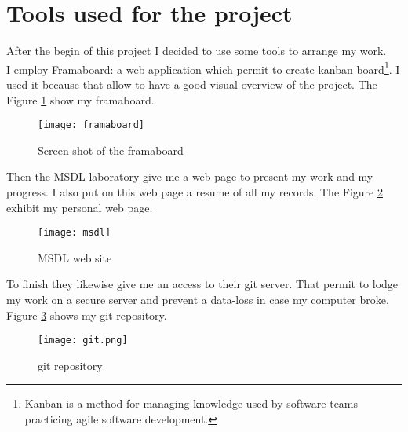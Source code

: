 \section{Tools used for the project}

After the begin of this project I decided to use some tools to arrange my work.
~\\

I employ Framaboard: a web application which permit to create kanban board\footnote{Kanban is a method for managing knowledge used by software teams practicing agile software development.\cite{wiki_kanban}}. I used it because that allow to have a good visual overview of the project. The Figure \ref{fig:framaboard} show my framaboard.

\begin{figure}[h]
  \centering
  \texttt{[image: framaboard]}
  \caption{Screen shot of the framaboard}
  \label{fig:framaboard}
\end{figure}

Then the MSDL laboratory give me a web page to present my work and my progress. I also put on this web page a resume of all my records. The Figure \ref{fig:msdl} exhibit my personal web page.

\begin{figure}[h]
  \centering
  \texttt{[image: msdl]}
  \caption{MSDL web site}
  \label{fig:msdl}
\end{figure}


To finish they likewise give me an access to their git server. That permit to lodge my work on a secure server and prevent a data-loss in case my computer broke. Figure \ref{fig:git} shows my git repository.

\begin{figure}[h]
  \centering
  \texttt{[image: git.png]}
  \caption{git repository}
  \label{fig:git}
\end{figure}



